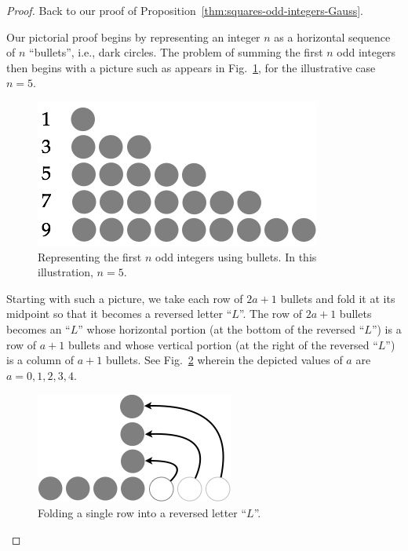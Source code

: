 \begin{proof}
\smallskip

\noindent
Back to our proof of Proposition~\ref{thm:squares-odd-integers-Gauss}.


%
Our pictorial proof begins by representing an integer $n$ as a
horizontal sequence of $n$ ``bullets'', i.e., dark circles.  The
problem of summing the first $n$ odd integers then begins with a
picture such as appears in Fig.~\ref{fig:sumOdds1}, for the
illustrative case $n=5$.
\begin{figure}[ht]
\begin{center}
       \includegraphics[scale=0.4]{FiguresMaths/SumOddsBasis}
\caption{Representing the first $n$ odd integers using bullets.  In
  this illustration, $n=5$.}
       \label{fig:sumOdds1}
\end{center}
\end{figure}

Starting with such a picture, we take each row of $2a+1$ bullets and
fold it at its midpoint so that it becomes a reversed letter ``$L$''.  The
row of $2a+1$ bullets becomes an ``$L$'' whose horizontal portion (at the
bottom of the reversed ``$L$'') is a row of $a+1$ bullets and whose
vertical portion (at the right of the reversed ``$L$'') is a column of
$a+1$ bullets.  See Fig.~\ref{fig:sumOdds2} wherein the depicted
values of $a$ are $a = 0, 1, 2, 3, 4$.
\begin{figure}[ht]
\begin{center}
       \includegraphics[scale=0.4]{FiguresMaths/SumOddsIntermediate}
              \caption{Folding a single row into a reversed letter ``$L$''.}
       \label{fig:sumOdds2}
\end{center}
\end{figure}


\end{proof}
